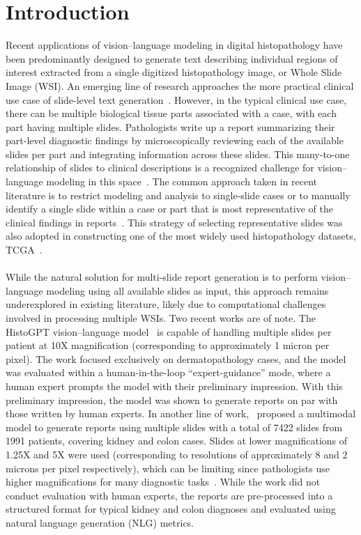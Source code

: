 \documentclass[11pt]{article}
\begin{document}
\section{Introduction}
\label{sec:introduction}
Recent applications of vision--language modeling in digital histopathology have been predominantly designed to generate text describing individual regions of interest extracted from a single digitized histopathology image, or Whole Slide Image (WSI). An emerging line of research approaches the more practical clinical use case of slide-level text generation~\citep{chen2024wsicaption,ahmed2024pathalign}. However, in the typical clinical use case, there can be multiple biological tissue parts associated with a case, with each part having multiple slides. Pathologists write up a report summarizing their part-level diagnostic findings by microscopically reviewing each of the available slides per part and integrating information across these slides. This many-to-one relationship of slides to clinical descriptions is a recognized challenge for vision--language modeling in this space~\citep{ahmed2024pathalign}. The common approach taken in recent literature is to restrict modeling and analysis to single-slide cases or to manually identify a single slide within a case or part that is most representative of the clinical findings in reports~\citep{zhou2024pathm3,guo2024histgen,chen2024wsicaption,shaikovski2024prism,xu2024whole,ahmed2024pathalign}. This strategy of selecting representative slides was also adopted in constructing one of the most widely used histopathology datasets, TCGA~\citep{cooper2018pancancer}. \\ \\
While the natural solution for multi-slide report generation is to perform vision--language modeling using all available slides as input, this approach remains underexplored in existing literature, likely due to computational challenges involved in processing multiple WSIs. Two recent works are of note. The HistoGPT vision--language model~\citep{tran2024generating} is capable of handling multiple slides per patient at 10X magnification (corresponding to approximately 1 micron per pixel). The work focused exclusively on dermatopathology cases, and the model was evaluated within a human-in-the-loop “expert-guidance” mode, where a human expert prompts the model with their preliminary impression. With this preliminary impression, the model was shown to generate reports on par with those written by human experts. In another line of work,~\citet{tan2024clinical} proposed a multimodal model to generate reports using multiple slides with a total of 7422 slides from 1991 patients, covering kidney and colon cases. Slides at lower magnifications of 1.25X and 5X were used (corresponding to resolutions of approximately 8 and 2 microns per pixel respectively), which can be limiting since pathologists use higher magnifications for many diagnostic tasks~\citep{kim2020re}. While the work did not conduct evaluation with human experts, the reports are pre-processed into a structured format for typical kidney and colon diagnoses and evaluated using natural language generation (NLG) metrics. \\ \\
\end{document}
